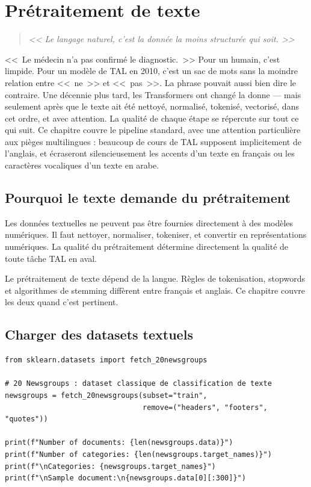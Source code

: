 \chapter{Pr\'etraitement de texte}
\label{ch:text-preprocessing}

\begin{quote}
\emph{<< Le langage naturel, c'est la donn\'ee la moins structur\'ee qui soit. >>}
\end{quote}

<<~Le médecin n'a pas confirmé le diagnostic.~>> Pour un humain, c'est limpide. Pour un modèle de TAL en 2010, c'est un sac de mots sans la moindre relation entre <<~ne~>> et <<~pas~>>. La phrase pouvait aussi bien dire le contraire. Une décennie plus tard, les Transformers ont changé la donne --- mais seulement après que le texte ait été nettoyé, normalisé, tokenisé, vectorisé, dans cet ordre, et avec attention. La qualité de chaque étape se répercute sur tout ce qui suit. Ce chapitre couvre le pipeline standard, avec une attention particulière aux pièges multilingues : beaucoup de cours de TAL supposent implicitement de l'anglais, et écraseront silencieusement les accents d'un texte en français ou les caractères vocaliques d'un texte en arabe.
\section{Pourquoi le texte demande du pr\'etraitement}

Les donn\'ees textuelles ne peuvent pas \^etre fournies directement \`a des mod\`eles num\'eriques. Il faut nettoyer, normaliser, tokeniser, et convertir en repr\'esentations num\'eriques. La qualit\'e du pr\'etraitement d\'etermine directement la qualit\'e de toute t\^ache TAL en aval.

\begin{datatip}
Le pr\'etraitement de texte d\'epend de la langue. R\`egles de tokenisation, stopwords et algorithmes de stemming diff\`erent entre fran\c{c}ais et anglais. Ce chapitre couvre les deux quand c'est pertinent.
\end{datatip}

\section{Charger des datasets textuels}

\begin{verbatim}
from sklearn.datasets import fetch_20newsgroups

# 20 Newsgroups : dataset classique de classification de texte
newsgroups = fetch_20newsgroups(subset="train",
                                remove=("headers", "footers", "quotes"))

print(f"Number of documents: {len(newsgroups.data)}")
print(f"Number of categories: {len(newsgroups.target_names)}")
print(f"\nCategories: {newsgroups.target_names}")
print(f"\nSample document:\n{newsgroups.data[0][:300]}")
\end{verbatim}

